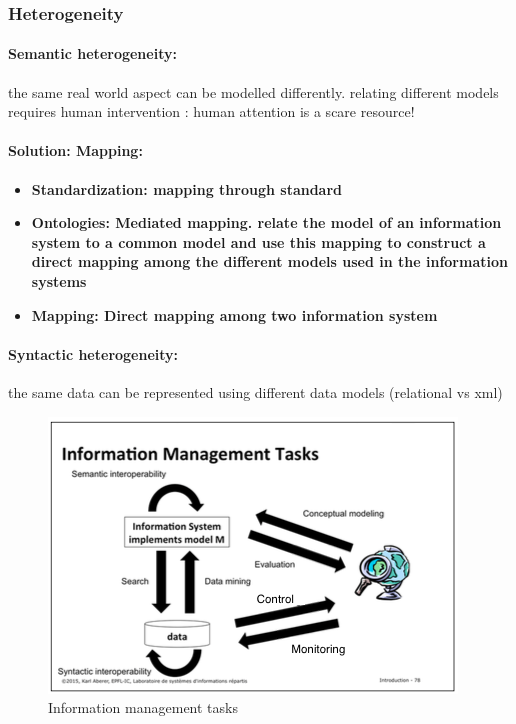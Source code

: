 \subsubsection{Heterogeneity}
\paragraph{Semantic heterogeneity:} the same real world aspect can be modelled differently. relating different models requires human intervention : human attention is a scare resource!

\paragraph{Solution: Mapping:}
\begin{itemize}
\item \bf{Standardization:} mapping through standard
\item \bf{Ontologies:} Mediated mapping. relate the model of an information system to a common model and use this mapping to construct a direct mapping among the different models used in the information systems\\
\item \bf{Mapping:} Direct mapping among two information system
\end{itemize}

\paragraph{Syntactic heterogeneity:} the same data can be represented using different data models (relational vs xml)

\begin{figure}[!h]
\begin{center}
\includegraphics[width=1\linewidth]{figures/informationManagementTasks2.png}
\end{center}
\caption{Information management tasks}
\end{figure}


